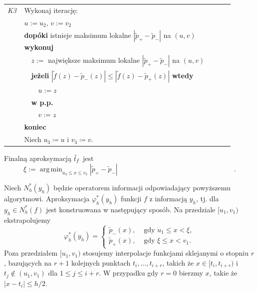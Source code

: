 \documentclass[oik, pdftex, man]{mgrwms}
\DeclareMathOperator*{\argmin}{arg\,min}
\begin{document}
    \begin{table}[H]
        \begin{tabular}{p{0.045\linewidth} p{0.85\linewidth}}
        \textit{K3} & Wykonaj iterację: \\
                        & $u := u_2$, $v := v_2$ \\
                        & \textbf{dopóki} istnieje maksimum lokalne $|\tilde{p}_{+} - \tilde{p}_{-}|$ na $(u,v)$ \textbf{wykonuj} \\
                        & $\quad$$z :=$ największe maksimum lokalne $|\tilde{p}_{+} - \tilde{p}_{-}|$ na $(u,v)$ \\
                        & $\quad$\textbf{jeżeli} $|\tilde{f}(z) - \tilde{p}_{-}(z)| \leq |\tilde{f}(z) - \tilde{p}_{+}(z)|$ \textbf{wtedy} \\
                        & $\quad\quad$$u:= z$ \\
                        & $\quad$\textbf{w p.p.} \\
                        & $\quad\quad$$v:= z$ \\
                        & \textbf{koniec} \\
                        & Niech $u_3 \coloneqq u$ i $v_3 \coloneqq v$.
        \end{tabular}
    \end{table}

    Finalną aproksymacją $\hat{t}_f$ jest
    \begin{equation*}
            \xi := \argmin_{u_3 \leq x \leq v_3}|\tilde{p}_{+} - \tilde{p}_{-}| \hspace{200pt}.
    \end{equation*}

    Niech $N_{h}^{*}(y_{h})$ będzie operatorem informacji odpowiadający powyższemu algorytmowi. Aproksymacja $\varphi_{h}^{*}(y_{h})$ funkcji $f$ z informacją $y_{h}$, tj. dla $y_{h} \in N_{h}^{*}(f)$ jest konstruowana w następujący sposób. Na przedziale $[u_{1}, v_{1})$ ekstrapolujemy
    \begin{equation*}
        \varphi_{h}^{*}\left(y_{h}\right)= \begin{cases}
            \tilde{p}_{-}(x),  &\text { gdy } u_{1} \leq x< \xi, \\
            \tilde{p}_{+}(x),  &\text { gdy } \xi \leq x<v_{1}.
        \end{cases}
    \end{equation*}
    Poza przedziałem $[u_{1}, v_{1})$ stosujemy interpolacje funkcjami sklejanymi o stopniu $r$, bazujących na $r+1$ kolejnych punktach $t_{i}, \ldots, t_{i+r}$, takich że $x \in [t_{i},t_{i+r})$ i $t_{j} \notin (u_{1},v_{1})$ dla $1 \leq j \leq i+r$. W przypadku gdy $r=0$ bierzmy $x$, takie że $|x-t_{i}| \leq h/2$.
\end{document}
